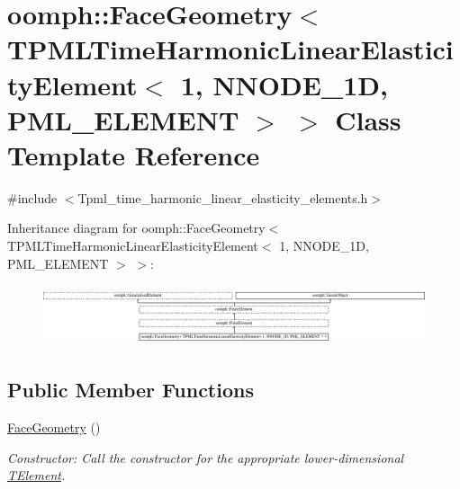 \hypertarget{classoomph_1_1FaceGeometry_3_01TPMLTimeHarmonicLinearElasticityElement_3_011_00_01NNODE__1D_00_01PML__ELEMENT_01_4_01_4}{}\section{oomph\+:\+:Face\+Geometry$<$ T\+P\+M\+L\+Time\+Harmonic\+Linear\+Elasticity\+Element$<$ 1, N\+N\+O\+D\+E\+\_\+1D, P\+M\+L\+\_\+\+E\+L\+E\+M\+E\+NT $>$ $>$ Class Template Reference}
\label{classoomph_1_1FaceGeometry_3_01TPMLTimeHarmonicLinearElasticityElement_3_011_00_01NNODE__1D_00_01PML__ELEMENT_01_4_01_4}


{\ttfamily \#include $<$Tpml\+\_\+time\+\_\+harmonic\+\_\+linear\+\_\+elasticity\+\_\+elements.\+h$>$}

Inheritance diagram for oomph\+:\+:Face\+Geometry$<$ T\+P\+M\+L\+Time\+Harmonic\+Linear\+Elasticity\+Element$<$ 1, N\+N\+O\+D\+E\+\_\+1D, P\+M\+L\+\_\+\+E\+L\+E\+M\+E\+NT $>$ $>$\+:\begin{figure}[H]
\begin{center}
\leavevmode
\includegraphics[height=1.803543cm]{classoomph_1_1FaceGeometry_3_01TPMLTimeHarmonicLinearElasticityElement_3_011_00_01NNODE__1D_00_01PML__ELEMENT_01_4_01_4}
\end{center}
\end{figure}
\subsection*{Public Member Functions}
\begin{DoxyCompactItemize}
\item 
\hyperlink{classoomph_1_1FaceGeometry_3_01TPMLTimeHarmonicLinearElasticityElement_3_011_00_01NNODE__1D_00_01PML__ELEMENT_01_4_01_4_a41ef7a0de41a359eb2cb50b2543a57f4}{Face\+Geometry} ()
\begin{DoxyCompactList}\small\item\em Constructor\+: Call the constructor for the appropriate lower-\/dimensional \hyperlink{classoomph_1_1TElement}{T\+Element}. \end{DoxyCompactList}\end{DoxyCompactItemize}
